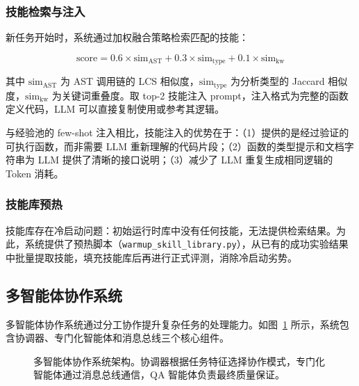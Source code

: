 \subsubsection{技能检索与注入}

新任务开始时，系统通过加权融合策略检索匹配的技能：

\begin{equation}
    \text{score} = 0.6 \times \text{sim}_{\text{AST}} + 0.3 \times \text{sim}_{\text{type}} + 0.1 \times \text{sim}_{\text{kw}}
\end{equation}

\noindent 其中 $\text{sim}_{\text{AST}}$ 为 AST 调用链的 LCS 相似度，$\text{sim}_{\text{type}}$ 为分析类型的 Jaccard 相似度，$\text{sim}_{\text{kw}}$ 为关键词重叠度。取 top-2 技能注入 prompt，注入格式为完整的函数定义代码，LLM 可以直接复制使用或参考其逻辑。

与经验池的 few-shot 注入相比，技能注入的优势在于：（1）提供的是经过验证的可执行函数，而非需要 LLM 重新理解的代码片段；（2）函数的类型提示和文档字符串为 LLM 提供了清晰的接口说明；（3）减少了 LLM 重复生成相同逻辑的 Token 消耗。

\subsubsection{技能库预热}

技能库存在冷启动问题：初始运行时库中没有任何技能，无法提供检索结果。为此，系统提供了预热脚本（\texttt{warmup\_skill\_library.py}），从已有的成功实验结果中批量提取技能，填充技能库后再进行正式评测，消除冷启动劣势。

\subsection{多智能体协作系统}

多智能体协作系统通过分工协作提升复杂任务的处理能力。如图~\ref{fig:multi-agent} 所示，系统包含协调器、专门化智能体和消息总线三个核心组件。

\begin{figure}[htbp]
    \centering
    \caption{多智能体协作系统架构。协调器根据任务特征选择协作模式，专门化智能体通过消息总线通信，QA 智能体负责最终质量保证。}
    \label{fig:multi-agent}
\end{figure}

